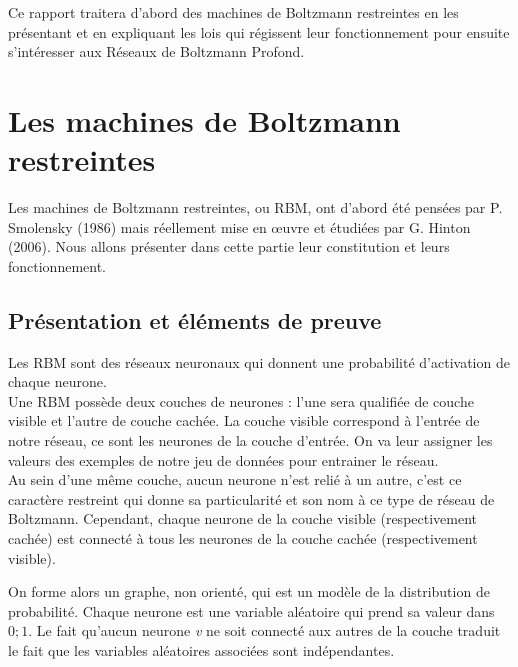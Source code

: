\documentclass[a4paper,oneside]{report}
\begin{document}
            Ce rapport traitera d'abord des machines de Boltzmann restreintes en les
            présentant et en expliquant les lois qui régissent leur fonctionnement pour
            ensuite s'intéresser aux Réseaux de Boltzmann Profond.

        \chapter{Les machines de Boltzmann restreintes}

            Les machines de Boltzmann restreintes, ou RBM, ont d'abord été
            pensées par P. Smolensky (1986) mais réellement mise en œuvre et
            étudiées par G.
            Hinton (2006). Nous allons présenter dans cette partie leur constitution et
            leurs fonctionnement.

            \section{Présentation et éléments de preuve}

                Les RBM sont des réseaux neuronaux qui donnent une
                probabilité d'activation de chaque neurone.\\

                Une RBM possède deux couches de neurones : l'une sera qualifiée 
                de couche visible et l'autre de couche cachée.
                La couche visible correspond à l'entrée de notre réseau, ce sont
                les neurones de la couche d'entrée. On va leur assigner les
                valeurs des exemples de notre jeu de données pour entrainer le
                réseau.\\

                Au sein d'une même couche, aucun neurone n'est relié à un
                autre, c'est ce caractère restreint qui donne sa particularité 
                et son nom à ce type de réseau de Boltzmann.
                Cependant, chaque neurone de la couche visible (respectivement
                cachée) est connecté à tous les neurones de la couche cachée 
                (respectivement visible). 
                
                On forme alors un graphe, non orienté, qui est un
                modèle de la distribution de probabilité. Chaque neurone est une variable aléatoire
                qui prend sa valeur dans \begin{math}{0;1}\end{math}. Le fait
                qu'aucun neurone \textit{v} ne soit connecté aux autres de la
                couche traduit le fait que les variables aléatoires associées
                sont indépendantes.
                
\end{document}
